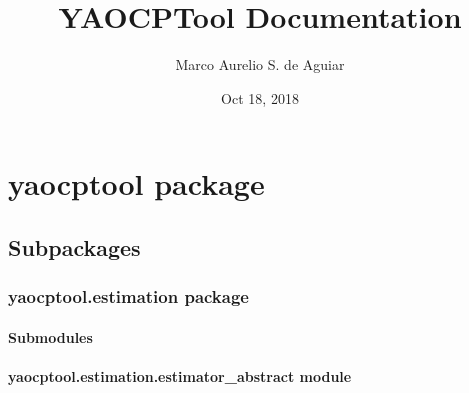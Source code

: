 \documentclass[letterpaper,10pt,english]{sphinxmanual}
\title{YAOCPTool Documentation}
\date{Oct 18, 2018}
\author{Marco Aurelio S. de Aguiar}
\begin{document}
\pagestyle{empty}
\maketitle
\pagestyle{plain}
\sphinxtableofcontents
\pagestyle{normal}
\label{\detokenize{index::doc}}



\chapter{yaocptool package}
\label{\detokenize{yaocptool:yaocptool-package}}\label{\detokenize{yaocptool::doc}}

\section{Subpackages}
\label{\detokenize{yaocptool:subpackages}}

\subsection{yaocptool.estimation package}
\label{\detokenize{yaocptool.estimation:yaocptool-estimation-package}}\label{\detokenize{yaocptool.estimation::doc}}

\subsubsection{Submodules}
\label{\detokenize{yaocptool.estimation:submodules}}

\subsubsection{yaocptool.estimation.estimator\_abstract module}
\label{\detokenize{yaocptool.estimation:module-yaocptool.estimation.estimator_abstract}}\label{\detokenize{yaocptool.estimation:yaocptool-estimation-estimator-abstract-module}}
\end{document}
